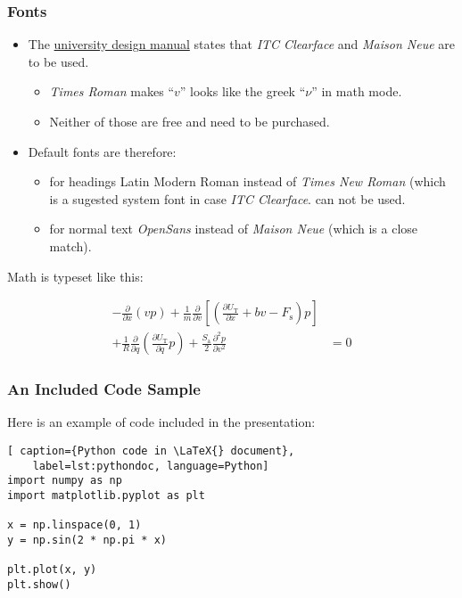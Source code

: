 \documentclass[american,aspectratio=169]{beamer}
\begin{document}
\begin{frame}[allowframebreaks]
	\frametitle{Fonts}
	\begin{itemize}
		\item The \href{https://brandpad.io/usn}{university design manual}
			states that \emph{ITC Clearface} and \emph{Maison Neue} are to be
			used.
			\begin{itemize}
				\item \textit{Times Roman} makes ``$v$'' looks like the greek
					``$\nu$'' in math mode. \item Neither of those are free and
					need to be purchased.
			\end{itemize}
		\item Default fonts are therefore:
			\begin{itemize}
				\item for headings {\rmfamily Latin Modern Roman} instead of
					\emph{Times
					New Roman} (which is a sugested system font in case
					\emph{ITC Clearface}.
					can not be used. \item for normal text \emph{OpenSans} instead of
					\emph{Maison Neue} (which is a close match).
			\end{itemize}
	\end{itemize}

Math is typeset like this:

\begin{align*}
	-\frac{\partial}{\partial x}\left(vp\right)
	+\frac{1}{m}\frac{\partial}{\partial v}\left[\left( \frac{\partial U_\mathrm{T}}{\partial x} +bv-F_\mathrm{s}\right)p\right] & \\
	+\frac{1}{R}\frac{\partial}{\partial q}\left( \frac{\partial U_\mathrm{T}}{\partial q}p\right)
	+ \frac{S_\mathrm{a}}{2}\frac{\partial^2p}{\partial v^2} & = 0
\end{align*}

\end{frame}

\begin{frame}[fragile]
	\frametitle{An Included Code Sample}

	Here is an example of code included in the presentation:

	\begin{lstlisting}[ caption={Python code in \LaTeX{} document},
	label=lst:pythondoc, language=Python]
import numpy as np
import matplotlib.pyplot as plt

x = np.linspace(0, 1)
y = np.sin(2 * np.pi * x)

plt.plot(x, y)
plt.show()
	\end{lstlisting}

\end{frame}
\end{document}
